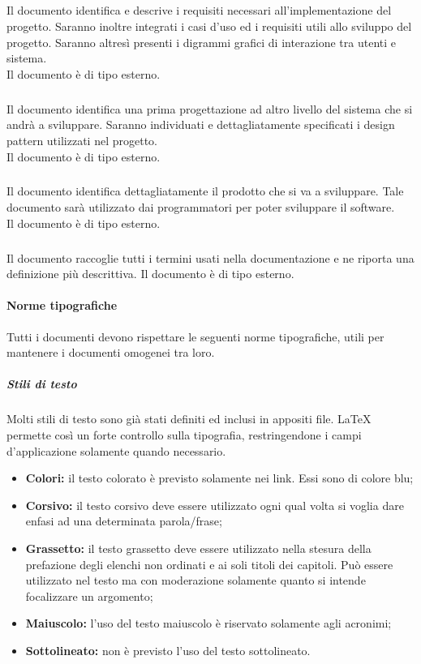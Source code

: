 				\subparagraph{\docNameAdR} Il documento identifica e descrive i requisiti necessari all'implementazione del progetto. Saranno inoltre integrati i casi d'uso ed i requisiti utili allo sviluppo del progetto. Saranno altresì presenti i digrammi grafici di interazione tra utenti e sistema.\\
				Il documento è di tipo esterno.

				\subparagraph{\docNameST} Il documento identifica una prima progettazione ad altro livello del sistema che si andrà a sviluppare. Saranno individuati e dettagliatamente specificati i design pattern utilizzati nel progetto.\\
				Il documento è di tipo esterno.

				\subparagraph{\docNameDdP} Il documento identifica dettagliatamente il prodotto che si va a sviluppare. Tale documento sarà utilizzato dai programmatori per poter sviluppare il software.\\ 
				Il documento è di tipo esterno.

				\subparagraph{\docNameGlo} Il documento raccoglie tutti i termini usati nella documentazione e ne riporta una definizione più descrittiva.  
				Il documento è di tipo esterno.


			\paragraph{Norme tipografiche}
			Tutti i documenti devono rispettare le seguenti norme tipografiche, utili per mantenere i documenti omogenei tra loro.
				
				\subparagraph{Stili di testo}
				Molti stili di testo sono già stati definiti ed inclusi in appositi file. \LaTeX{} permette così un forte controllo sulla tipografia, restringendone i campi d'applicazione solamente quando necessario.  
				\begin{itemize}
					\item \textbf{Colori:} il testo colorato è previsto solamente nei link. Essi sono di colore blu;
					\item \textbf{Corsivo:} il testo corsivo deve essere utilizzato ogni qual volta si voglia dare enfasi ad una determinata parola/frase;
					\item \textbf{Grassetto:} il testo grassetto deve essere utilizzato nella stesura della prefazione degli elenchi non ordinati e ai soli titoli dei capitoli. Può essere utilizzato nel testo ma con moderazione solamente quanto si intende focalizzare un argomento;
					\item \textbf{Maiuscolo:} l'uso del testo maiuscolo è riservato solamente agli acronimi;
					\item \textbf{Sottolineato:} non è previsto l'uso del testo sottolineato.
				\end{itemize}

